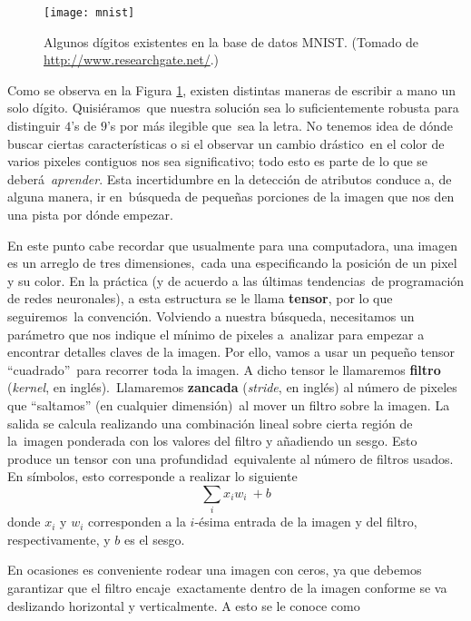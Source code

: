 \begin{figure}
  \centering
  \texttt{[image: mnist]}
  \caption{Algunos dígitos existentes en la base de datos MNIST.
    (Tomado de \url{http://www.researchgate.net/}.)}
  \label{mnist_fig}
\end{figure}

Como se observa en la Figura \ref{mnist_fig}, existen distintas maneras de escribir a mano un solo dígito. Quisiéramos\
que nuestra solución sea lo suficientemente robusta para distinguir $4$'s de $9$'s por más ilegible que\
sea la letra. No tenemos idea de dónde buscar ciertas características o si el observar un cambio drástico\
en el color de varios pixeles contiguos nos sea significativo; todo esto es parte de lo que se deberá\
\emph{aprender}. Esta incertidumbre en la detección de atributos conduce a, de alguna manera, ir en\
búsqueda de pequeñas porciones de la imagen que nos den una pista por dónde empezar.\par
En este punto cabe recordar que usualmente para una computadora, una imagen es un arreglo de tres dimensiones,\
cada una especificando la posición de un pixel y su color. En la práctica (y de acuerdo a las últimas tendencias\
de programación de redes neuronales), a esta estructura se le llama \textbf{tensor}, por lo que seguiremos\
la convención. Volviendo a nuestra búsqueda, necesitamos un parámetro que nos indique el mínimo de pixeles a\
analizar para empezar a encontrar detalles claves de la imagen. Por ello, vamos a usar un pequeño tensor ``cuadrado''\
para recorrer toda la imagen. A dicho tensor le llamaremos \textbf{filtro} (\emph{kernel}, en inglés).\
Llamaremos \textbf{zancada} (\emph{stride}, en inglés) al número de pixeles que ``saltamos'' (en cualquier dimensión)\
al mover un filtro sobre la imagen. La salida se calcula realizando una combinación lineal sobre cierta región de la\
imagen ponderada con los valores del filtro y añadiendo un sesgo. Esto produce un tensor con una profundidad\
equivalente al número de filtros usados. En símbolos, esto corresponde a realizar lo siguiente
\begin{equation} \label{entry-wise-sum}
  \sum _{i} x_i w_i\ + b
\end{equation}
donde $x_i$ y $w_i$ corresponden a la $i$-ésima entrada de la imagen y del filtro, respectivamente, y $b$ es el sesgo.\par
En ocasiones es conveniente rodear una imagen con ceros, ya que debemos garantizar que el filtro encaje\
exactamente dentro de la imagen conforme se va deslizando horizontal y verticalmente. A esto se le conoce como\
